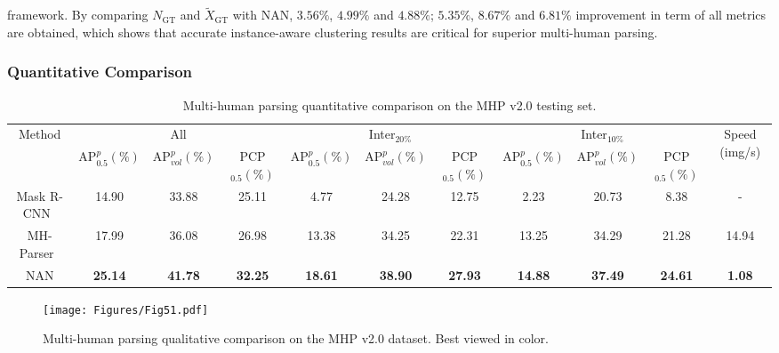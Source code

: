 \documentclass[10pt,twocolumn,letterpaper]{article}
\theoremstyle{definition}
\theoremstyle{remark}
\begin{document}
framework. By comparing $N_\mathrm{GT}$ and $\tilde{X}_\mathrm{GT}$ with NAN, $3.56\%$, $4.99\%$ and $4.88\%$; $5.35\%$, $8.67\%$ and $6.81\%$ improvement in term of all metrics are obtained, which shows that accurate instance-aware clustering results are critical for superior multi-human parsing. 

\subsubsection{Quantitative Comparison}

\begin{table*}[t]\setlength{\tabcolsep}{4pt}
	\scriptsize
	\caption{\small Multi-human parsing quantitative comparison on the MHP v2.0 testing set.}
	\vspace{-5mm}
	\begin{center}
		\begin{tabular}{ccccccccccc}
			\hline
			\multirow{2}{*}{Method} &\multicolumn{3}{c}{All} & \multicolumn{3}{c}{Inter$_{20\%}$} & \multicolumn{3}{c}{Inter$_{10\%}$} & \multirow{2}{*}{Speed (img/s)} \\
			\cline{2-10}
			& {$\mathrm{AP}^{p}_{0.5} (\%)$} & {$\mathrm{AP}^{p}_{vol} (\%)$} & {PCP$_{0.5} (\%)$} & {$\mathrm{AP}^{p}_{0.5} (\%)$} & {$\mathrm{AP}^{p}_{vol} (\%)$} & {PCP$_{0.5} (\%)$} & {$\mathrm{AP}^{p}_{0.5} (\%)$} & {$\mathrm{AP}^{p}_{vol} (\%)$} & {PCP$_{0.5} (\%)$} \\
			\hline
			Mask R-CNN~\cite{he2017mask} & 14.90 & 33.88 & 25.11 & 4.77 & 24.28 & 12.75 & 2.23 & 20.73 & 8.38 & - \\
			MH-Parser~\cite{li2017towards} & 17.99 & 36.08 & 26.98 & 13.38 & 34.25 & 22.31 & 13.25 & 34.29 & 21.28 & 14.94 \\
			\hline
			NAN & \textbf{25.14} & \textbf{41.78} & \textbf{32.25} & \textbf{18.61} & \textbf{38.90} & \textbf{27.93} & \textbf{14.88} & \textbf{37.49} & \textbf{24.61} & \textbf{1.08} \\
			\hline
		\end{tabular}
	\end{center}
	\label{tab: Tab3}
	\vspace{-3mm}
\end{table*}

\begin{figure*}[t]
	\begin{center}
		\texttt{[image: Figures/Fig51.pdf]}
	\end{center}
	\vspace{-5mm}
	\small
	\caption{\small Multi-human parsing qualitative comparison on the MHP v2.0 dataset. Best viewed in color.}
	\label{fig: Fig5_1}
	\vspace{-2mm}
\end{figure*}
\end{document}
